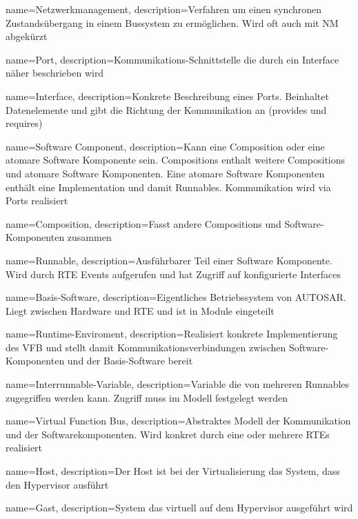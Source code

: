  {
   name=Netzwerkmanagement,
   description={Verfahren um einen synchronen Zustandsübergang in einem Bussystem zu ermöglichen. Wird oft auch mit NM abgekürzt}
}


 {
   name=Port,
   description={Kommunikations-Schnittstelle die durch ein Interface näher beschrieben wird}
}

 {
   name=Interface,
   description={Konkrete Beschreibung eines Ports. Beinhaltet Datenelemente und gibt die Richtung der Kommunikation an (provides und requires)}
}

 {
   name=Software Component,
   description={Kann eine Composition oder eine atomare Software Komponente sein. Compositions enthalt weitere Compositions und atomare Software Komponenten. Eine atomare Software Komponenten enthält eine Implementation und damit Runnables. Kommunikation wird via Ports realisiert}
}

 {
   name=Composition,
   description={Fasst andere Compositions und Software-Komponenten zusammen}
}

 {
   name=Runnable,
   description={Ausführbarer Teil einer Software Komponente. Wird durch RTE Events aufgerufen und hat Zugriff auf konfigurierte Interfaces}
}

 {
   name=Basis-Software,
   description={Eigentliches Betriebssystem von AUTOSAR. Liegt zwischen Hardware und RTE und ist in Module eingeteilt}
}

 {
   name=Runtime-Enviroment,
   description={Realisiert konkrete Implementierung des VFB und stellt damit Kommunikationsverbindungen zwischen Software-Komponenten und der Basis-Software bereit}
}

 {
   name=Interrunnable-Variable,
   description={Variable die von mehreren Runnables zugegriffen werden kann. Zugriff muss im Modell festgelegt werden}
}

 {
   name=Virtual Function Bus,
   description={Abstraktes Modell der Kommunikation und der Softwarekomponenten. Wird konkret durch eine oder mehrere RTEs realisiert}
}

 {
   name=Host,
   description={Der Host ist bei der Virtualisierung das System, dass den Hypervisor ausführt}
}

 {
   name=Gast,
   description={System das virtuell auf dem Hypervisor ausgeführt wird}
}
